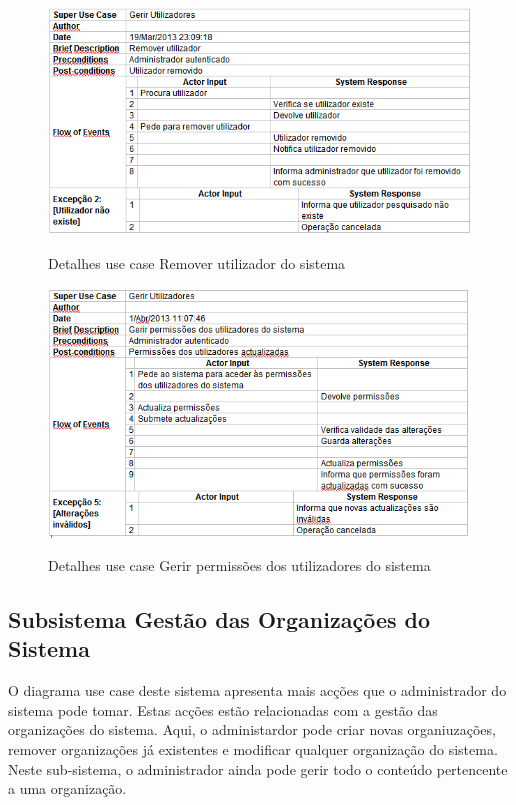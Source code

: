 \documentclass[12pt,a4paper]{article}
\begin{document}
\begin{figure}[h!]
\centering
\includegraphics[scale=0.7]{d_usecase/A_removerutilizador}
\label{usecase}
\caption{Detalhes use case Remover utilizador do sistema}
\end{figure}

\begin{figure}[h!]
\centering
\includegraphics[scale=0.7]{d_usecase/A_permissoes}
\label{usecase}
\caption{Detalhes use case Gerir permissões dos utilizadores do sistema} 
\end{figure}

\clearpage

\subsection{Subsistema Gestão das Organizações do Sistema}
O diagrama use case deste sistema apresenta mais acções que o administrador do sistema
pode tomar. Estas acções estão relacionadas com a gestão das organizações do sistema. Aqui, o
administardor pode criar novas organiuzações, remover organizações já existentes e modificar qualquer organização do sistema. Neste sub-sistema, o administrador ainda pode gerir todo o conteúdo pertencente a uma organização.\\
\end{document}
